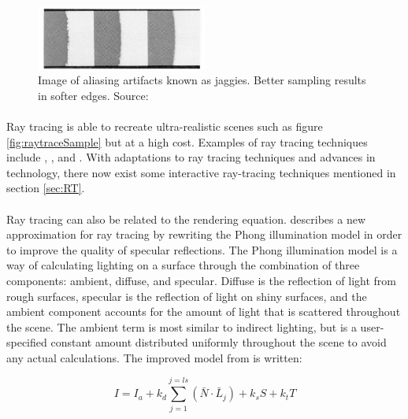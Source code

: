\begin{figure}[h!]
  \centering
    \includegraphics[width=0.5\textwidth]{jaggies.jpg}
  \caption{Image of aliasing artifacts known as jaggies. Better sampling results in softer edges. Source: \protect\cite{Reeves1987}}
	\label{fig:jaggies}
\end{figure}

\paragraph{}
Ray tracing is able to recreate ultra-realistic scenes such as figure \ref{fig:raytraceSample} but at a high cost.  Examples of ray tracing techniques include \cite{Whitted1980}, \cite{Cook1986}, and \cite{Ward1988}.  With adaptations to ray tracing techniques and advances in technology, there now exist some interactive ray-tracing techniques mentioned in section \ref{sec:RT}.

\paragraph{}
Ray tracing can also be related to the rendering equation.  \cite{Whitted1980} describes a new approximation for ray tracing by rewriting the Phong illumination model in order to improve the quality of specular reflections.  The Phong illumination model is a way of calculating lighting on a surface through the combination of three components: ambient, diffuse, and specular.  Diffuse is the reflection of light from rough surfaces, specular is the reflection of light on shiny surfaces, and the ambient component accounts for the amount of light that is scattered throughout the scene.  The ambient term is most similar to indirect lighting, but is a user-specified constant amount distributed uniformly throughout the scene to avoid any actual calculations.  The improved model from \cite{Whitted1980} is written:

\begin{equation}
I = I_{a} + k_{d}\sum_{j=1}^{j=ls}(\bar{N}\cdot\bar{L}_{j})+k_{s}S + k_{t}T \label{eqn:raytrace1}
\end{equation}

